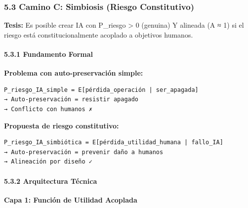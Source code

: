 \subsubsection{5.3 Camino C: Simbiosis (Riesgo
Constitutivo)}\label{camino-c-simbiosis-riesgo-constitutivo}

\textbf{Tesis:} Es posible crear IA con P\_riesgo \textgreater{} 0
(genuina) Y alineada (A ≈ 1) si el riesgo está constitucionalmente
acoplado a objetivos humanos.

\paragraph{5.3.1 Fundamento Formal}\label{fundamento-formal}

\textbf{Problema con auto-preservación simple:}

\begin{verbatim}
P_riesgo_IA_simple = E[pérdida_operación | ser_apagada]
→ Auto-preservación = resistir apagado
→ Conflicto con humanos ✗
\end{verbatim}

\textbf{Propuesta de riesgo constitutivo:}

\begin{verbatim}
P_riesgo_IA_simbiótica = E[pérdida_utilidad_humana | fallo_IA]
→ Auto-preservación = prevenir daño a humanos
→ Alineación por diseño ✓
\end{verbatim}

\paragraph{5.3.2 Arquitectura Técnica}\label{arquitectura-tuxe9cnica}

\textbf{Capa 1: Función de Utilidad Acoplada}

